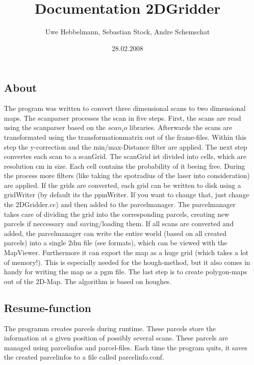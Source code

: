 \documentclass{article}
\title{Documentation 2DGridder}
\author{Uwe Hebbelmann, Sebastian Stock, Andre Schemschat}
\date{28.02.2008}
\begin{document}
\maketitle{}

\section{}
\subsection{About}
The program was written to convert three dimensional scans to two dimensional
maps. The scanparser processes the scan in five steps. First, the scans are read
using the scanparser based on the $scan_ io$ libraries. \newline
Afterwards the scans are transformated using the transformationmatrix out of
the frame-files. Within this step the y-correction and the min/max-Distance	
filter are applied.\newline
The next step convertes each scan to a scanGrid. The scanGrid ist divided into
cells, which are resolution cm in size. Each cell contains the probability of
it beeing free. During the process more filters (like taking the spotradius of 
the laser into consideration) are applied.\newline
If the grids are converted,
each grid can be written to disk using a gridWriter (by default its the ppmWriter. 
If you want to change that, just change the 2DGridder.cc) and then added to
the parcelmanager.\newline
The parcelmanager takes care of dividing the grid
into the corresponding parcels, creating new parcels if neccessary and saving/loading
them. If all scans are converted and added, the parcelmanager can write the
entire world (based on all created parcels) into a single 2dm file (see
formats), which can be viewed with the MapViewer. Furthermore it can export the
map as a huge grid (which takes a lot of memory!). This is especially needed
for the hough-method, but it also comes in handy for writing the map as a pgm
file.
The last step is to create polygon-maps out of the 2D-Map. The algorithm is
based on houghes.

\subsection{Resume-function}
The programm creates parcels during runtime. These parcels store the
information at a given position of possibly several scans. These parcels
are managed using parcelinfos and parcel-files. Each time the program quits,
it saves the created parcelinfos to a file called parcelinfo.conf. 
\end{document}
